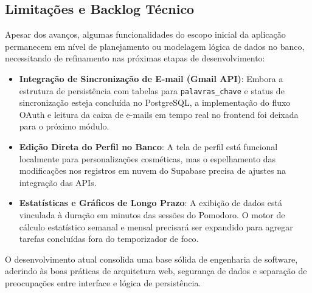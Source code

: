 \documentclass[12pt,a4paper]{article}
\begin{document}
\subsection{Limitações e Backlog Técnico}
Apesar dos avanços, algumas funcionalidades do escopo inicial da aplicação permanecem em nível de planejamento ou modelagem lógica de dados no banco, necessitando de refinamento nas próximas etapas de desenvolvimento:
\begin{itemize}
    \item \textbf{Integração de Sincronização de E-mail (Gmail API)}: Embora a estrutura de persistência com tabelas para \texttt{palavras\_chave} e status de sincronização esteja concluída no PostgreSQL, a implementação do fluxo OAuth e leitura da caixa de e-mails em tempo real no frontend foi deixada para o próximo módulo.
    \item \textbf{Edição Direta do Perfil no Banco}: A tela de perfil está funcional localmente para personalizações cosméticas, mas o espelhamento das modificações nos registros em nuvem do Supabase precisa de ajustes na integração das APIs.
    \item \textbf{Estatísticas e Gráficos de Longo Prazo}: A exibição de dados está vinculada à duração em minutos das sessões do Pomodoro. O motor de cálculo estatístico semanal e mensal precisará ser expandido para agregar tarefas concluídas fora do temporizador de foco.
\end{itemize}

O desenvolvimento atual consolida uma base sólida de engenharia de software, aderindo às boas práticas de arquitetura web, segurança de dados e separação de preocupações entre interface e lógica de persistência.
\end{document}
